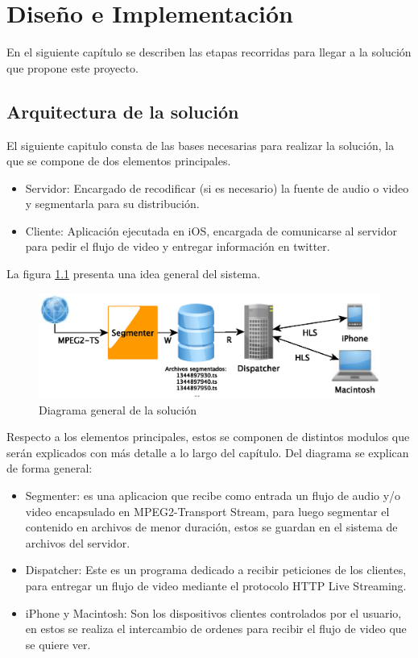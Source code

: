 \chapter{Diseño e Implementación}
En el siguiente capítulo se describen las etapas recorridas para llegar a la solución que propone este proyecto.
\section{Arquitectura de la solución}
El siguiente capitulo consta de las bases necesarias para realizar la solución, la que se compone de dos elementos principales. 
\begin{itemize}
\item Servidor: Encargado de recodificar (si es necesario) la fuente de audio o video y segmentarla para su distribución.
\item Cliente: Aplicación ejecutada en iOS, encargada de comunicarse al servidor para pedir el flujo de video y entregar información en twitter.
\end{itemize}
La figura \ref{diagramaGral} presenta una idea general del sistema.\\

\begin{figure}[H]
	\centering
	\includegraphics[scale=0.8]{imgs/diagrama_general.eps}
	\caption{Diagrama general de la solución}
	\label{diagramaGral}
\end{figure}

Respecto a los elementos principales, estos se componen de distintos modulos que serán explicados con más detalle a lo largo del capítulo. Del diagrama se explican de forma general:
\begin{itemize}
\item Segmenter: es una aplicacion que recibe como entrada un flujo de audio y/o video encapsulado en MPEG2-Transport Stream, para luego segmentar el contenido en archivos de menor duración, estos se guardan en el sistema de archivos del servidor.
\item Dispatcher: Este es un programa dedicado a recibir peticiones de los clientes, para entregar un flujo de video mediante el protocolo HTTP Live Streaming.
\item iPhone y Macintosh: Son los dispositivos clientes controlados por el usuario, en estos se realiza el intercambio de ordenes para recibir el flujo de video que se quiere ver.
\end{itemize}

